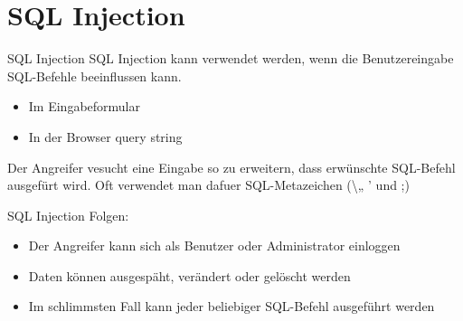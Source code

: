 \documentclass[10pt]{beamer}
\begin{document}

\section{SQL Injection}

\begin{frame}[fragile]{SQL Injection}
  SQL Injection kann verwendet werden, wenn die Benutzereingabe SQL-Befehle beeinflussen kann.
  \begin{itemize}
    \item Im Eingabeformular
    \item In der Browser query string
  \end{itemize}
  Der Angreifer vesucht eine Eingabe so zu erweitern, dass erw\"unschte SQL-Befehl ausgef\"urt wird. Oft verwendet man dafuer SQL-Metazeichen (\textbackslash „ ' und ;)

\end{frame}
\begin{frame}[fragile]{SQL Injection}
  Folgen:
  \begin{itemize}
    \item Der Angreifer kann sich als Benutzer oder Administrator einloggen
    \item Daten k\"onnen ausgesp\"aht, ver\"andert oder gel\"oscht werden
    \item Im schlimmsten Fall kann jeder beliebiger SQL-Befehl ausgef\"uhrt werden
  \end{itemize}
\end{frame}

\end{document}
